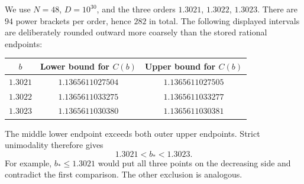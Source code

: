 We use $N=48$, $D=10^{30}$, and the three orders $1.3021$, $1.3022$, $1.3023$. There are $94$ power brackets per order, hence $282$ in total. The following displayed intervals are deliberately rounded outward more coarsely than the stored rational endpoints:
\begin{center}
\begin{tabular}{ccc}
\toprule
$b$ & Lower bound for $C(b)$ & Upper bound for $C(b)$\\
\midrule
$1.3021$ & $1.1365611027504$ & $1.1365611027505$\\
$1.3022$ & $1.1365611033275$ & $1.1365611033277$\\
$1.3023$ & $1.1365611030380$ & $1.1365611030381$\\
\bottomrule
\end{tabular}
\end{center}
The middle lower endpoint exceeds both outer upper endpoints. Strict unimodality therefore gives
\begin{equation}\label{eq:bstarcert}
 1.3021<b_*<1.3023.
\end{equation}
For example, $b_*\le1.3021$ would put all three points on the decreasing side and contradict the first comparison. The other exclusion is analogous.

